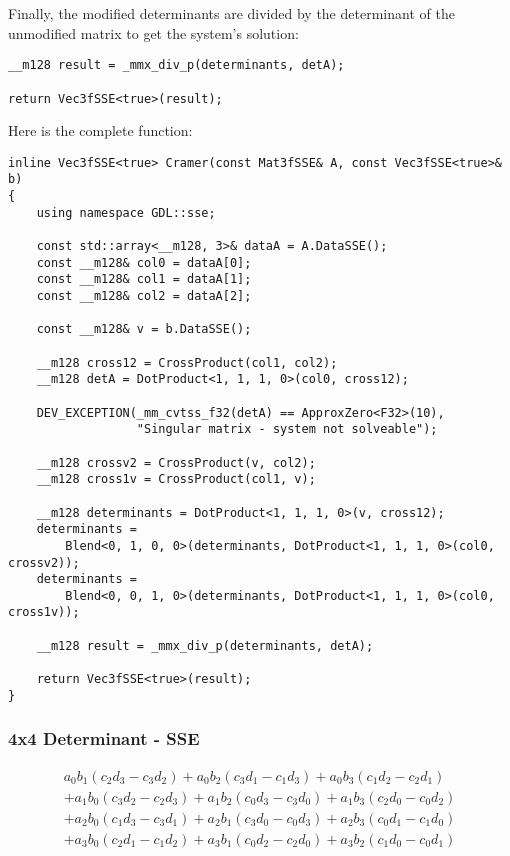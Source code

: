 \documentclass[fontsize = 10pt,DIV = 13]{scrartcl}
\newcommand{\pth}[1]{\left(#1\right)}
\begin{document}
Finally, the modified determinants are divided by the determinant of the unmodified matrix to get the system's solution:

\begin{verbatim}
__m128 result = _mmx_div_p(determinants, detA);

return Vec3fSSE<true>(result);
\end{verbatim}


Here is the complete function:

\begin{verbatim}
inline Vec3fSSE<true> Cramer(const Mat3fSSE& A, const Vec3fSSE<true>& b)
{
    using namespace GDL::sse;

    const std::array<__m128, 3>& dataA = A.DataSSE();
    const __m128& col0 = dataA[0];
    const __m128& col1 = dataA[1];
    const __m128& col2 = dataA[2];

    const __m128& v = b.DataSSE();

    __m128 cross12 = CrossProduct(col1, col2);
    __m128 detA = DotProduct<1, 1, 1, 0>(col0, cross12);

    DEV_EXCEPTION(_mm_cvtss_f32(detA) == ApproxZero<F32>(10), 
                  "Singular matrix - system not solveable");

    __m128 crossv2 = CrossProduct(v, col2);
    __m128 cross1v = CrossProduct(col1, v);

    __m128 determinants = DotProduct<1, 1, 1, 0>(v, cross12);
    determinants = 
        Blend<0, 1, 0, 0>(determinants, DotProduct<1, 1, 1, 0>(col0, crossv2));
    determinants = 
        Blend<0, 0, 1, 0>(determinants, DotProduct<1, 1, 1, 0>(col0, cross1v));

    __m128 result = _mmx_div_p(determinants, detA);

    return Vec3fSSE<true>(result);
}
\end{verbatim}

\subsubsection{4x4 Determinant - SSE}
\label{sec:determinant4x4SSE}

\begin{align*}
  a_0b_1 \pth{c_2d_3 - c_3d_2} 
+ a_0b_2 \pth{c_3d_1 - c_1d_3}
+ a_0b_3 \pth{c_1d_2 - c_2d_1}\\
+ a_1b_0 \pth{c_3d_2 - c_2d_3}
+ a_1b_2 \pth{c_0d_3 - c_3d_0}
+ a_1b_3 \pth{c_2d_0 - c_0d_2}\\
+ a_2b_0 \pth{c_1d_3 - c_3d_1}
+ a_2b_1 \pth{c_3d_0 - c_0d_3}
+ a_2b_3 \pth{c_0d_1 - c_1d_0}\\
+ a_3b_0 \pth{c_2d_1 - c_1d_2}
+ a_3b_1 \pth{c_0d_2 - c_2d_0}
+ a_3b_2 \pth{c_1d_0 - c_0d_1}
\end{align*}
\end{document}
